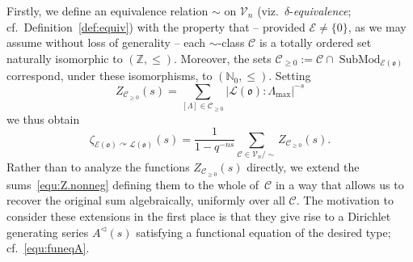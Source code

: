\documentclass[11pt]{amsart}
\numberwithin{equation}{section}
\numberwithin{figure}{section}
\theoremstyle{plain}
\theoremstyle{definition}
\theoremstyle{remark}
\begin{document}
Firstly, we define an equivalence relation $\sim$ on ${\ensuremath{\mathcal{V}}}_n$ (viz.\
$\delta$-\emph{equivalence}; cf.\ Definition~\ref{def:equiv}) with the
property that -- provided ${\mathcal{E}}\neq \{0\}$, as we may assume without
loss of generality -- each $\sim$-class ${{\mathcal{C}}}$ is a totally ordered
set naturally isomorphic to $({\ensuremath{\mathbb{Z}}},\leq)$. Moreover, the sets
${{\mathcal{C}}}_{\geq0} := {{\mathcal{C}}} \cap \operatorname{SubMod}_{{\mathcal{E}}({\mathfrak o})}$ correspond, under
these isomorphisms, to $({\ensuremath{\mathbb{N}}}_0,\leq)$.  Setting
\begin{equation}\label{equ:Z.nonneg}
  Z_{{{\mathcal{C}}}_{\geq0}}(s) =  \sum_{[\Lambda]\in{{\mathcal{C}}}_{\geq0}} |{\ensuremath{\mathcal{L}}}({\mathfrak o}):\Lambda_{\max}|^{-s}
\end{equation}
we thus obtain
\begin{equation}\label{equ:zeta.nonneg}
 \zeta_{{\mathcal{E}}({\mathfrak o}){\curvearrowright} {\ensuremath{\mathcal{L}}}({\mathfrak o})}(s) = \frac{1}{1-q^{-ns}}
\sum_{{{\mathcal{C}}} \in {\ensuremath{\mathcal{V}}}_n/\sim} Z_{{{\mathcal{C}}}_{\geq0}}(s).
\end{equation}
Rather than to analyze the functions $Z_{{{\mathcal{C}}}_{\geq0}}(s)$ directly,
we extend the sums~\eqref{equ:Z.nonneg} defining them to the whole
of~${{\mathcal{C}}}$ in a way that allows us to recover the original sum
algebraically, uniformly over all ${{\mathcal{C}}}$. The motivation to consider
these extensions in the first place is that they give rise to a
Dirichlet generating series $A^{\triangleleft}(s)$ satisfying a functional
equation of the desired type; cf.\ \eqref{equ:funeqA}.
\end{document}
